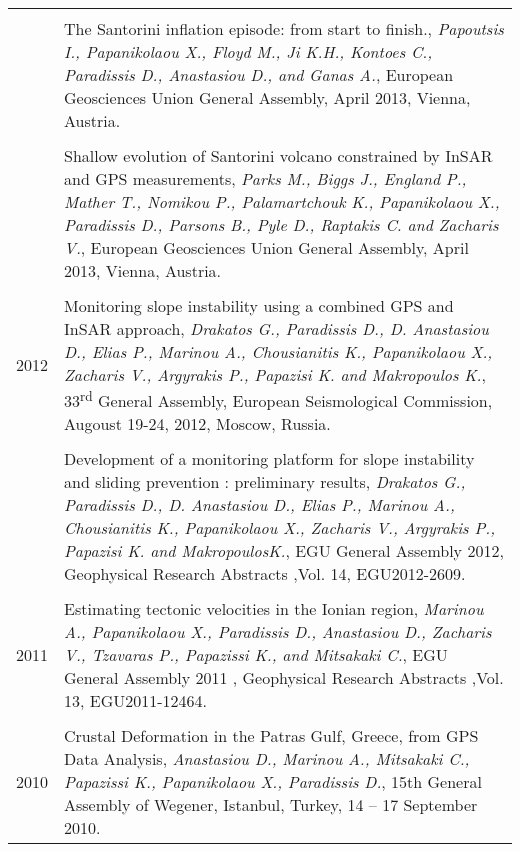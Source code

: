 \documentclass[a4paper,10pt]{article} %
\begin{document}
\begin{longtable}{r|p{14cm}}
  &\\

  & The Santorini inflation episode: from start to finish.,
  \emph{Papoutsis I., Papanikolaou X., Floyd M., Ji K.H., Kontoes C., Paradissis D., Anastasiou D., and Ganas A.},
  European Geosciences Union General Assembly, April 2013, Vienna, Austria.\\

  &\\

  & Shallow evolution of Santorini volcano constrained by InSAR and GPS measurements,
  \emph{Parks M., Biggs J., England P., Mather T., Nomikou P., Palamartchouk K., Papanikolaou X., Paradissis D., Parsons B., Pyle D., Raptakis C. and Zacharis V.},
  European Geosciences Union General Assembly, April 2013, Vienna, Austria.\\

\multicolumn{2}{c}{} \\
  \textsc{2012}
  & Monitoring slope instability using a combined GPS and InSAR approach,
  \emph{Drakatos G., Paradissis D., D. Anastasiou D., Elias P., Marinou A., Chousianitis K., Papanikolaou X., Zacharis V., Argyrakis P., Papazisi K. and Makropoulos K.},
  33\textsuperscript{rd} General Assembly, European Seismological Commission, Augoust 19-24, 2012, Moscow, Russia.\\

  &\\

  & Development of a monitoring platform for slope instability and sliding prevention : preliminary results,
  \emph{Drakatos G., Paradissis D., D. Anastasiou D., Elias P., Marinou A., Chousianitis K., Papanikolaou X., Zacharis V., Argyrakis P., Papazisi K. and MakropoulosK.},
  EGU General Assembly 2012, Geophysical Research Abstracts ,Vol. 14, EGU2012-2609.\\

\multicolumn{2}{c}{} \\
  \textsc{2011}
  & Estimating tectonic velocities in the Ionian region, 
  \emph{Marinou Α., Papanikolaou X., Paradissis D., Anastasiou D., Zacharis V., Tzavaras P., Papazissi K., and Mitsakaki C.},
  EGU General Assembly 2011 , Geophysical Research Abstracts ,Vol. 13, EGU2011-12464.\\

\multicolumn{2}{c}{} \\
  \textsc{2010}
  & Crustal Deformation in the Patras Gulf, Greece, from GPS Data Analysis,
  \emph{Anastasiou D., Marinou A., Mitsakaki C., Papazissi K., Papanikolaou X., Paradissis D.},
  15th General Assembly of Wegener, Istanbul, Turkey, 14 – 17 September 2010.\\


\end{longtable}
\end{document}
